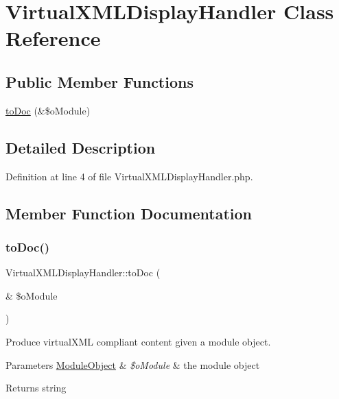 \hypertarget{classVirtualXMLDisplayHandler}{}\section{Virtual\+X\+M\+L\+Display\+Handler Class Reference}
\label{classVirtualXMLDisplayHandler}
\subsection*{Public Member Functions}
\begin{DoxyCompactItemize}
\item 
\hyperlink{classVirtualXMLDisplayHandler_a2e96cf87736df31a1caa68b0a76c8503}{to\+Doc} (\&\$o\+Module)
\end{DoxyCompactItemize}


\subsection{Detailed Description}


Definition at line 4 of file Virtual\+X\+M\+L\+Display\+Handler.\+php.



\subsection{Member Function Documentation}
\mbox{\label{classVirtualXMLDisplayHandler_a2e96cf87736df31a1caa68b0a76c8503}} 
\subsubsection{\texorpdfstring{to\+Doc()}{toDoc()}}
{\footnotesize\ttfamily Virtual\+X\+M\+L\+Display\+Handler\+::to\+Doc (\begin{DoxyParamCaption}\item[{\&}]{\$o\+Module }\end{DoxyParamCaption})}

Produce virtual\+X\+ML compliant content given a module object.~\newline

\begin{DoxyParams}[1]{Parameters}
\hyperlink{classModuleObject}{Module\+Object} & {\em \$o\+Module} & the module object \\
\hline
\end{DoxyParams}
\begin{DoxyReturn}{Returns}
string 
\end{DoxyReturn}


